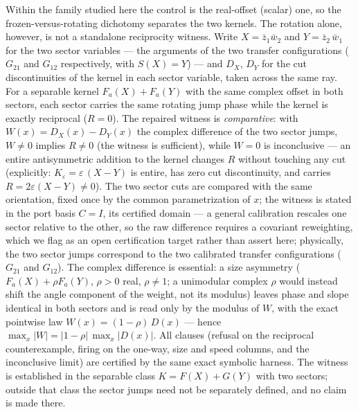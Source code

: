 \documentclass[11pt,a4paper]{article}
\newcommand{\zbone}{\bar{z}_1}
\newcommand{\wbtwo}{\bar{w}_2}
\begin{document}
Within the family studied here the control is the real-offset (scalar)
one, so the frozen-versus-rotating dichotomy separates the two kernels. The rotation
alone, however, is not a standalone reciprocity witness. Write
$X = \zbone \wbtwo$ and $Y = \bar{z}_2\, \bar{w}_1$ for the two sector
variables --- the arguments of the two transfer configurations ($G_{21}$
and $G_{12}$ respectively, with $S(X) = Y$) --- and $D_X$, $D_Y$ for the
cut discontinuities of the kernel in each sector variable, taken across the
same ray. For a separable
kernel $F_a(X) + F_a(Y)$ with the same complex offset in both sectors, each
sector carries the same rotating jump phase while the kernel is exactly
reciprocal ($R = 0$). The repaired witness is \emph{comparative}: with
$W(x) = D_X(x) - D_Y(x)$ the complex difference of the two sector jumps,
$W \neq 0$ implies $R \neq 0$ (the witness is sufficient), while $W = 0$ is
inconclusive --- an entire antisymmetric addition to the kernel changes $R$
without touching any cut (explicitly: $K_{\varepsilon} = \varepsilon\,(X -
Y)$ is entire, has zero cut discontinuity, and carries
$R = 2\varepsilon (X - Y) \neq 0$). The two sector cuts are compared with
the same orientation, fixed once by the common parametrization of $x$;
the witness is stated in the port basis $C = I$, its certified domain --- a
general calibration rescales one sector relative to the other, so the raw
difference requires a covariant reweighting, which we flag as an open
certification target rather than assert here; physically, the two sector jumps
correspond to the two calibrated transfer configurations ($G_{21}$ and
$G_{12}$). The complex difference is essential: a size
asymmetry ($F_a(X) + \rho F_a(Y)$, $\rho > 0$ real, $\rho \neq 1$; a
unimodular complex $\rho$ would instead shift the angle component of the
weight, not its modulus) leaves phase and slope identical in both sectors and is read only by
the modulus of $W$, with the
exact pointwise law $W(x) = (1-\rho)\,D(x)$ --- hence
$\max_x|W| = |1-\rho|\,\max_x|D(x)|$. All clauses (refusal on the reciprocal
counterexample, firing on the one-way, size and speed columns, and the
inconclusive limit) are certified by the same exact symbolic harness. The
witness is established in the separable class $K = F(X) + G(Y)$ with two
sectors; outside that class the sector jumps need not be separately defined,
and no claim is made there.
\end{document}
